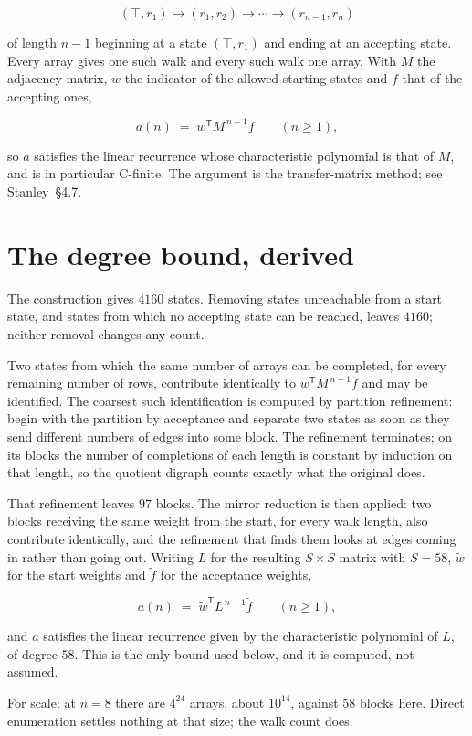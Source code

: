 \documentclass[11pt]{article}
\theoremstyle{definition}
\begin{document}
\[(\top,r_1) \to (r_1,r_2) \to \cdots \to (r_{n-1},r_n)\]

of length $n-1$ beginning at a state $(\top,r_1)$ and ending at an accepting state. Every array gives one such walk and every such walk one array. With $M$ the adjacency matrix, $w$ the indicator of the allowed starting states and $f$ that of the accepting ones,

\[a(n) \;=\; w^{\mathsf T} M^{\,n-1} f \qquad (n \ge 1),\]

so $a$ satisfies the linear recurrence whose characteristic polynomial is that of $M$, and is in particular C-finite. The argument is the transfer-matrix method; see Stanley~\S4.7.

\section{The degree bound, derived}

The construction gives $4160$ states. Removing states unreachable from a start state, and states from which no accepting state can be reached, leaves $4160$; neither removal changes any count.

Two states from which the same number of arrays can be completed, for every remaining number of rows, contribute identically to $w^{\mathsf T}M^{\,n-1}f$ and may be identified. The coarsest such identification is computed by partition refinement: begin with the partition by acceptance and separate two states as soon as they send different numbers of edges into some block. The refinement terminates; on its blocks the number of completions of each length is constant by induction on that length, so the quotient digraph counts exactly what the original does.

That refinement leaves $97$ blocks. The mirror reduction is then applied: two blocks receiving the same weight from the start, for every walk length, also contribute identically, and the refinement that finds them looks at edges coming in rather than going out. Writing $L$ for the resulting $S \times S$ matrix with $S = 58$, $\tilde w$ for the start weights and $\tilde f$ for the acceptance weights,

\[a(n) \;=\; \tilde w^{\mathsf T} L^{\,n-1} \tilde f \qquad (n \ge 1),\]

and $a$ satisfies the linear recurrence given by the characteristic polynomial of $L$, of degree $58$. This is the only bound used below, and it is computed, not assumed.

For scale: at $n = 8$ there are $4^{24}$ arrays, about $10^{14}$, against $58$ blocks here. Direct enumeration settles nothing at that size; the walk count does.
\end{document}
